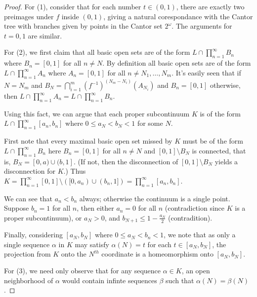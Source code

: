 \begin{proof}
For (1), consider that for each number $t\in(0,1)$, there are exactly two preimages under $f$ inside $(0,1)$, giving a natural corespondance with the Cantor tree with branches given by points in the Cantor set $2^\omega$. The arguments for $t=0,1$ are similar.

For (2), we first claim that all basic open sets are of the form $L\cap\prod_{n=1}^\infty B_n$ where $B_n=[0,1]$ for all $n\not=N$. By definition all basic open sets are of the form $L\cap\prod_{n=1}^\infty A_n$ where $A_n=[0,1]$ for all $n\not=N_1,\dots,N_m$. It's easily seen that if $N=N_m$ and $B_N = \bigcap_{i=1}^m (f^{-1})^{(N_m-N_i)}(A_{N_i})$ and $B_n=[0,1]$ otherwise, then $L\cap\prod_{n=1}^\infty A_n = L\cap\prod_{n=1}^\infty B_n$.

Using this fact, we can argue that each proper subcontinuum $K$ is of the form $L \cap \prod_{n=1}^\infty [a_n,b_n]$ where $0\leq a_N < b_N < 1$ for some $N$. 

First note that every maximal basic open set missed by $K$ must be of the form $L\cap\prod_{n=1}^\infty B_n$ here $B_n=[0,1]$ for all $n\not=N$ and $[0,1] \setminus B_N$ is connected, that is, $B_N=[0,a)\cup(b,1]$. (If not, then the disconnection of $[0,1]\setminus B_N$ yields a disconnection for $K$.) Thus $K = \prod_{n=1}^\infty [0,1]\setminus ([0,a_n)\cup(b_n,1]) = \prod_{n=1}^\infty [a_n,b_n]$.

We can see that $a_n<b_n$ always; otherwise the continuum is a single point. Suppose $b_n = 1$ for all $n$, then either $a_n=0$ for all $n$ (contradiction since $K$ is a proper subcontinuum), or $a_N>0$, and $b_{N+1}\leq 1-\frac{a_N}{2}$ (contradition).

Finally, considering $[a_N,b_N]$ where $0\leq a_N<b_n<1$, we note that as only a single sequence $\alpha$ in $K$ may satisfy $\alpha(N)=t$ for each $t\in [a_N,b_N]$, the projection from $K$ onto the $N^{th}$ coordinate is a homeomorphism onto $[a_N,b_N]$.

For (3), we need only observe that for any sequence $\alpha\in K$, an open neighborhood of $\alpha$ would contain infinte sequences $\beta$ such that $\alpha(N)=\beta(N)$.

\end{proof}

